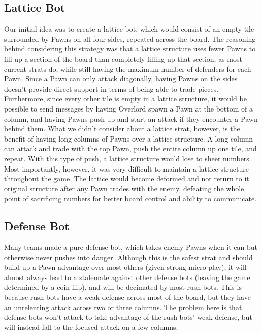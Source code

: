 \documentclass{article}
\begin{document}
\subsection{Lattice Bot}
\hspace{\parindent}
Our initial idea was to create a lattice bot, which would consist of an empty tile surrounded by Pawns on all four sides, repeated across the board. The reasoning behind considering this strategy was that a lattice structure uses fewer Pawns to fill up a section of the board than completely filling up that section, as most current strats do, while still having the maximum number of defenders for each Pawn. Since a Pawn can only attack diagonally, having Pawns on the sides doesn’t provide direct support in terms of being able to trade pieces. Furthermore, since every other tile is empty in a lattice structure, it would be possible to send messages by having Overlord spawn a Pawn at the bottom of a column, and having Pawns push up and start an attack if they encounter a Pawn behind them. 
\bigbreak
What we didn’t consider about a lattice strat, however, is the benefit of having long columns of Pawns over a lattice structure. A long column can attack and trade with the top Pawn, push the entire column up one tile, and repeat. With this type of push, a lattice structure would lose to sheer numbers. Most importantly, however, it was very difficult to maintain a lattice structure throughout the game. The lattice would become deformed and not return to it original structure after any Pawn trades with the enemy, defeating the whole point of sacrificing numbers for better board control and ability to communicate.

\subsection{Defense Bot}
\hspace{\parindent}
Many teams made a pure defense bot, which takes enemy Pawns when it can but otherwise never pushes into danger. Although this is the safest strat and should build up a Pawn advantage over most others (given strong micro play), it will almost always lead to a stalemate against other defense bots (leaving the game determined by a coin flip), and will be decimated by most rush bots. This is because rush bots have a weak defense across most of the board, but they have an unrelenting attack across two or three columns. The problem here is that defense bots won’t attack to take advantage of the rush bots’ weak defense, but will instead fall to the focused attack on a few columns. 
\end{document}

